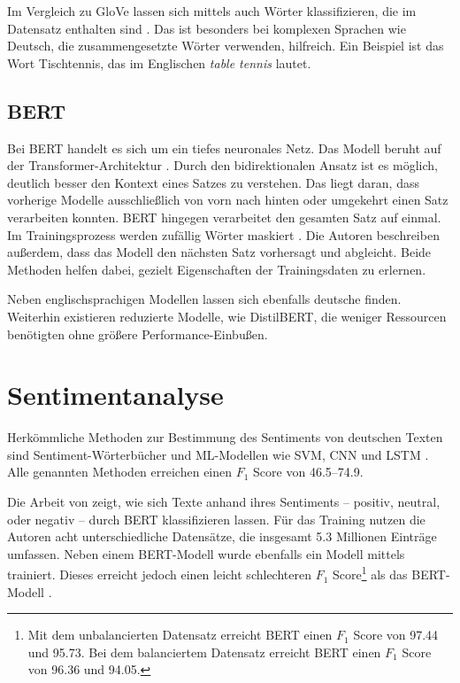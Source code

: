 Im Vergleich zu \ac{GloVe} lassen sich mittels \ft auch Wörter klassifizieren, die im Datensatz enthalten sind \autocite{guhr_training_2020, bojanowski_enriching_2017}. Das ist besonders bei komplexen Sprachen wie Deutsch, die zusammengesetzte Wörter verwenden, hilfreich. Ein Beispiel ist das Wort Tischtennis, das im Englischen \textit{table tennis} lautet.

\subsection*{BERT}

Bei \ac{BERT} handelt es sich um ein tiefes neuronales Netz. Das Modell beruht auf der Transformer-Architektur \autocite[3]{devlin_bert_2019}. Durch den bidirektionalen Ansatz ist es möglich, deutlich besser den Kontext eines Satzes zu verstehen. Das liegt daran, dass vorherige Modelle ausschließlich von vorn nach hinten oder umgekehrt einen Satz verarbeiten konnten. \ac{BERT} hingegen verarbeitet den gesamten Satz auf einmal. Im Trainingsprozess werden zufällig Wörter maskiert \autocite[4]{devlin_bert_2019}. Die Autoren beschreiben außerdem, dass das Modell den nächsten Satz vorhersagt und abgleicht. Beide Methoden helfen dabei, gezielt Eigenschaften der Trainingsdaten zu erlernen.

Neben englischsprachigen Modellen lassen sich ebenfalls deutsche finden. Weiterhin existieren reduzierte Modelle, wie DistilBERT, die weniger Ressourcen benötigten ohne größere Performance-Einbußen.

\section{Sentimentanalyse} \label{sec:sentimentanalysis}

Herkömmliche Methoden zur Bestimmung des Sentiments von deutschen Texten sind Sentiment-Wörterbücher und \ac{ML}-Modellen wie \ac{SVM}, \ac{CNN} und \ac{LSTM} \autocite[1627\psq]{guhr_training_2020}. Alle genannten Methoden erreichen einen $F_1$ Score von \numrange{46.5}{74.9}.

Die Arbeit von \textcite{guhr_training_2020} zeigt, wie sich Texte anhand ihres Sentiments -- positiv, neutral, oder negativ -- durch \ac{BERT} klassifizieren lassen. Für das Training nutzen die Autoren acht unterschiedliche Datensätze, die insgesamt \num{5.3} Millionen Einträge umfassen. Neben einem \ac{BERT}-Modell wurde ebenfalls ein Modell mittels \ft trainiert. Dieses erreicht jedoch einen leicht schlechteren $F_1$ Score\footnote{Mit dem unbalancierten Datensatz erreicht \ac{BERT} einen $F_1$ Score von \num{97.44} und \ft \num{95.73}. Bei dem balanciertem Datensatz erreicht \ac{BERT} einen $F_1$ Score von \num{96.36} und \ft \num{94.05}.} als das \ac{BERT}-Modell \autocite[]{guhr_training_2020}.

